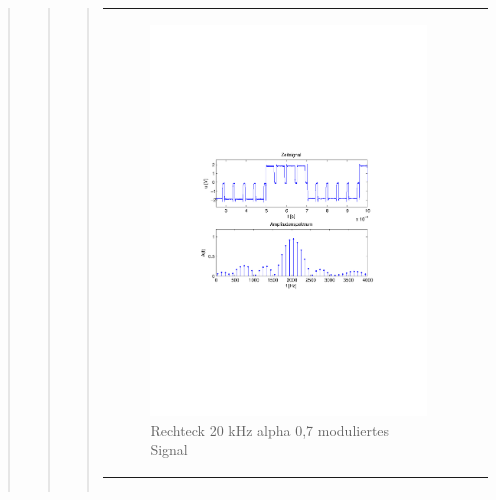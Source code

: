\begin{quote}
\begin{quote}
\begin{quote}
\begin{center}
\begin{tabular}{ll}
                \begin{minipage}{0.6\textwidth}
                    \begin{figure}[H]
                        \includegraphics[scale=0.55, trim = 16mm 70mm 16mm 85mm, clip]{Bilder/flatrec20_07abget_zeit}
                       \caption{Rechteck 20 kHz alpha 0,7 moduliertes Signal}
		              \label{fig:flatrec20_07zeit}
                    \end{figure}
                \end{minipage}
            
            \end{tabular}
            \end{center}
            
            \begin{center}
            \begin{tabular}{ll}
            

\end{tabular}
\end{center}
\end{quote}
\end{quote}
\end{quote}
